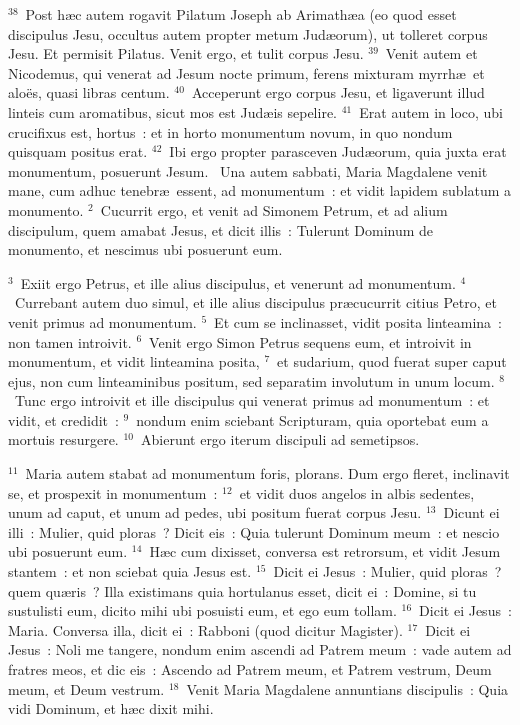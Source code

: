 ${}^{38}$~Post h\ae c autem rogavit Pilatum Joseph ab Arimath\ae a (eo quod esset discipulus Jesu, occultus autem propter metum Jud\ae orum), ut tolleret corpus Jesu. Et permisit Pilatus. Venit ergo, et tulit corpus Jesu.
${}^{39}$~Venit autem et Nicodemus, qui venerat ad Jesum nocte primum, ferens mixturam myrrh\ae\ et alo\"es, quasi libras centum.
${}^{40}$~Acceperunt ergo corpus Jesu, et ligaverunt illud linteis cum aromatibus, sicut mos est Jud\ae is sepelire.
${}^{41}$~Erat autem in loco, ubi crucifixus est, hortus~: et in horto monumentum novum, in quo nondum quisquam positus erat.
${}^{42}$~Ibi ergo propter parasceven Jud\ae orum, quia juxta erat monumentum, posuerunt Jesum.
~\lettrine[lines=10,image=true,loversize=0.05,lraise=-0.03]{U}{}na autem sabbati, Maria Magdalene venit mane, cum adhuc tenebr\ae\ essent, ad monumentum~: et vidit lapidem sublatum a monumento.
${}^{2}$~Cucurrit ergo, et venit ad Simonem Petrum, et ad alium discipulum, quem amabat Jesus, et dicit illis~: Tulerunt Dominum de monumento, et nescimus ubi posuerunt eum.


${}^{3}$~Exiit ergo Petrus, et ille alius discipulus, et venerunt ad monumentum.
${}^{4}$~Currebant autem duo simul, et ille alius discipulus pr\ae cucurrit citius Petro, et venit primus ad monumentum.
${}^{5}$~Et cum se inclinasset, vidit posita linteamina~: non tamen introivit.
${}^{6}$~Venit ergo Simon Petrus sequens eum, et introivit in monumentum, et vidit linteamina posita,
${}^{7}$~et sudarium, quod fuerat super caput ejus, non cum linteaminibus positum, sed separatim involutum in unum locum.
${}^{8}$~Tunc ergo introivit et ille discipulus qui venerat primus ad monumentum~: et vidit, et credidit~:
${}^{9}$~nondum enim sciebant Scripturam, quia oportebat eum a mortuis resurgere.
${}^{10}$~Abierunt ergo iterum discipuli ad semetipsos.


${}^{11}$~Maria autem stabat ad monumentum foris, plorans. Dum ergo fleret, inclinavit se, et prospexit in monumentum~:
${}^{12}$~et vidit duos angelos in albis sedentes, unum ad caput, et unum ad pedes, ubi positum fuerat corpus Jesu.
${}^{13}$~Dicunt ei illi~: Mulier, quid ploras~? Dicit eis~: Quia tulerunt Dominum meum~: et nescio ubi posuerunt eum.
${}^{14}$~H\ae c cum dixisset, conversa est retrorsum, et vidit Jesum stantem~: et non sciebat quia Jesus est.
${}^{15}$~Dicit ei Jesus~: Mulier, quid ploras~? quem qu\ae ris~? Illa existimans quia hortulanus esset, dicit ei~: Domine, si tu sustulisti eum, dicito mihi ubi posuisti eum, et ego eum tollam.
${}^{16}$~Dicit ei Jesus~: Maria. Conversa illa, dicit ei~: Rabboni (quod dicitur Magister).
${}^{17}$~Dicit ei Jesus~: Noli me tangere, nondum enim ascendi ad Patrem meum~: vade autem ad fratres meos, et dic eis~: Ascendo ad Patrem meum, et Patrem vestrum, Deum meum, et Deum vestrum.
${}^{18}$~Venit Maria Magdalene annuntians discipulis~: Quia vidi Dominum, et h\ae c dixit mihi.



